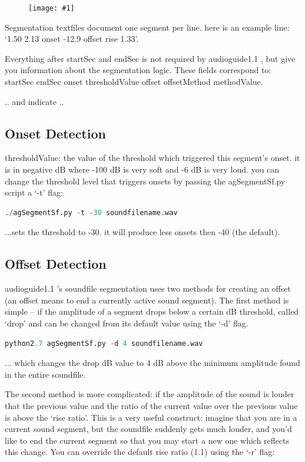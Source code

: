 \documentclass{article}
\newcommand{\figurewrap}[2]{\begin{figure}[h!]
\centering
\texttt{[image: \#1]}
\end{figure}}
\newcommand{\ag}{audioguide1.1 }
\begin{document}
\begin{spacing}{1.2}
\figurewrap{image1.png}{1}

Segmentation textfiles document one segment per line. here is an example line: `1.50 2.13 onset -12.9 offset rise 1.33'.

Everything after startSec and endSec is not required by \ag, but give you information about the segmentation logic.  These fields correspond to: startSec endSec onset thresholdValue offset offsetMethod methodValue.

.. and indicate ..

\subsection{Onset Detection}
thresholdValue: the value of the threshold which triggered this segment's onset. it is in negative dB where -100 dB is very soft and -6 dB is very loud. you can change the threshold level that triggers onsets by passing the agSegmentSf.py script a `-t' flag:
\begin{lstlisting}[language=python]
./agSegmentSf.py -t -30 soundfilename.wav
\end{lstlisting}
...sets the threshold to -30. it will produce less onsets then -40 (the default).

\subsection{Offset Detection}
\ag's soundfile segmentation uses two methods for creating an offset (an offset means to end a currently active sound segment).  
The first method is simple -- if the amplitude of a segment drops below a certain dB threshold, called `drop' and can be changed from its default value using the `-d' flag.

\begin{lstlisting}[language=python]
python2.7 agSegmentSf.py -d 4 soundfilename.wav
\end{lstlisting}

... which changes the drop dB value to 4 dB above the minimum amplitude found in the entire soundfile.

The second method is more complicated: if the amplitude of the sound is louder that the previous value and the ratio of the current value over the previous value is above the `rise ratio'.  This is a very useful construct: imagine that you are in a current sound segment, but the soundfile suddenly gets much louder, and you'd like to end the current segment so that you may start a new one which reflects this change.  You can override the default rise ratio (1.1) using the `-r' flag:


\end{spacing}
\end{document}
